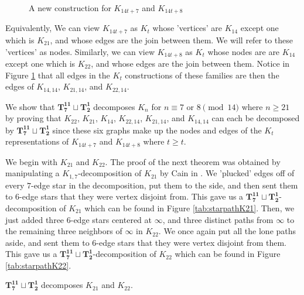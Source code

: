 \begin{figure}[H]
\begin{center}
    \end{center}
    \caption{A new construction for $K_{14t+7}$ and $K_{14t+8}$}
    \label{fig:newconstrK21K22}
  \end{figure}
Equivalently, We can view $K_{14t+7}$ as $K_{t}$ whose 'vertices' are $K_{14}$ except one which is $K_{21}$, and whose edges are the join between them. We will refer to these 'vertices' as nodes. Similarly, we can view $K_{14t+8}$ as $K_{t}$ whose nodes are are $K_{14}$ except one which is $K_{22}$, and whose edges are the join between them. Notice in Figure \ref{fig:newconstrK21K22} that all edges in the $K_{t}$ constructions of these families are then the edges of $K_{14,14}$, $K_{21,14}$, and $K_{22,14}$.

We show that $\mathbf{T_{7}^{11}}\sqcup\mathbf{T_{2}^{1}}$ decomposes $K_{n}$ for $n\equiv7 \textrm{ or }8\pmod{14}$ where $n\geq 21$ by proving that $K_{22}$, $K_{21}$, $K_{14}$, $K_{22,14}$, $K_{21,14}$, and $K_{14,14}$ can each be decomposed by $\mathbf{T_{7}^{11}}\sqcup\mathbf{T_{2}^{1}}$ since these six graphs make up the nodes and edges of the $K_{t}$ representations of $K_{14t+7}$ and $K_{14t+8}$ where $t\geq t$.\newline

We begin with $K_{21}$ and $K_{22}$. The proof of the next theorem was obtained by manipulating a $K_{1,7}$-decomposition of $K_{21}$ by Cain in \cite{bib:Cain}. We 'plucked' edges off of every $7$-edge star in the decomposition, put them to the side, and then sent them to $6$-edge stars that they were vertex disjoint from. This gave us a $\mathbf{T_{7}^{11}}\sqcup\mathbf{T_{2}^{1}}$-decomposition of $K_{21}$ which can be found in Figure \ref{tab:starpathK21}. Then, we just added three $6$-edge stars centered at $\infty$, and three distinct paths from $\infty$ to the remaining three neighbors of $\infty$ in $K_{22}$. We once again put all the lone paths aside, and sent them to $6$-edge stars that they were vertex disjoint from them. This gave us a $\mathbf{T_{7}^{11}}\sqcup\mathbf{T_{2}^{1}}$-decomposition of $K_{22}$ which can be found in Figure \ref{tab:starpathK22}.
\begin{thm}\label{thm:PCstarpath}
    $\mathbf{T_{7}^{11}}\sqcup\mathbf{T_{2}^{1}}$ decomposes $K_{21}$ and $K_{22}$.
\end{thm}

